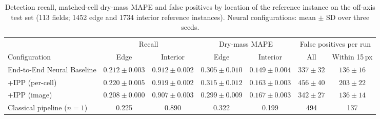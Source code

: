 \begin{table}[!htbp]
\centering
\caption{Detection recall, matched-cell dry-mass MAPE and false positives by
location of the reference instance on the off-axis test set (113 fields; 1452 edge
and 1734 interior reference instances). Neural
configurations: mean $\pm$ SD over three seeds.}
\label{tab:edge}
\footnotesize
\begin{tabular*}{\textwidth}{@{\extracolsep{\fill}}lcccccc@{}}
\toprule
 & \multicolumn{2}{c}{Recall} & \multicolumn{2}{c}{Dry-mass MAPE} & \multicolumn{2}{c}{False positives per run} \\
\cmidrule(lr){2-3}\cmidrule(lr){4-5}\cmidrule(lr){6-7}
Configuration & Edge & Interior & Edge & Interior & All & Within 15\,px \\
\midrule
End-to-End Neural Baseline & $0.212 \pm 0.003$ & $0.912 \pm 0.002$ & $0.305 \pm 0.010$ & $0.149 \pm 0.004$ & $337 \pm 32$ & $136 \pm 16$ \\
+IPP (per-cell) & $0.220 \pm 0.005$ & $0.919 \pm 0.002$ & $0.315 \pm 0.012$ & $0.163 \pm 0.003$ & $456 \pm 40$ & $203 \pm 22$ \\
+IPP (image) & $0.208 \pm 0.000$ & $0.907 \pm 0.003$ & $0.299 \pm 0.009$ & $0.167 \pm 0.003$ & $342 \pm 27$ & $136 \pm 14$ \\
\midrule
Classical pipeline ($n=1$) & 0.225 & 0.890 & 0.322 & 0.199 & 494 & 137 \\
\bottomrule
\end{tabular*}
\end{table}
